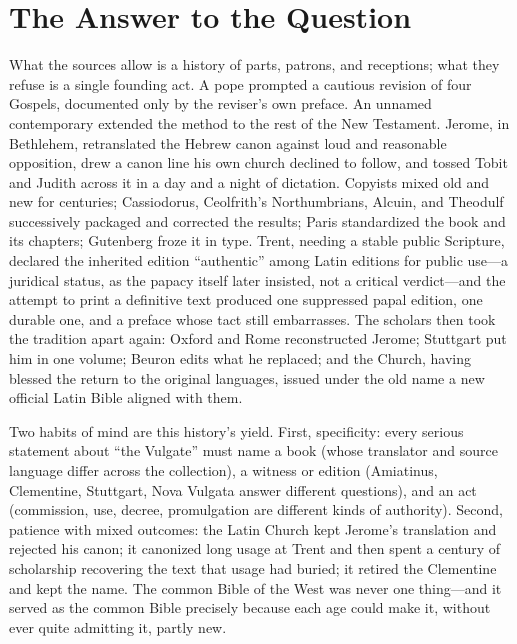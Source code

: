 \section{The Answer to the Question}

What the sources allow is a history of parts, patrons, and receptions;
what they refuse is a single founding act. A pope prompted a cautious
revision of four Gospels, documented only by the reviser's own preface.
An unnamed contemporary extended the method to the rest of the New
Testament. Jerome, in Bethlehem, retranslated the Hebrew canon against
loud and reasonable opposition, drew a canon line his own church declined
to follow, and tossed Tobit and Judith across it in a day and a night of
dictation. Copyists mixed old and new for centuries; Cassiodorus,
Ceolfrith's Northumbrians, Alcuin, and Theodulf successively packaged and
corrected the results; Paris standardized the book and its chapters;
Gutenberg froze it in type. Trent, needing a stable public Scripture,
declared the inherited edition ``authentic'' among Latin editions for
public use---a juridical status, as the papacy itself later insisted, not
a critical verdict---and the attempt to print a definitive text produced
one suppressed papal edition, one durable one, and a preface whose tact
still embarrasses. The scholars then took the tradition apart again:
Oxford and Rome reconstructed Jerome; Stuttgart put him in one volume;
Beuron edits what he replaced; and the Church, having blessed the return
to the original languages, issued under the old name a new official Latin
Bible aligned with them.

Two habits of mind are this history's yield. First, specificity: every
serious statement about ``the Vulgate'' must name a book (whose
translator and source language differ across the collection), a witness
or edition (Amiatinus, Clementine, Stuttgart, Nova Vulgata answer
different questions), and an act (commission, use, decree, promulgation
are different kinds of authority). Second, patience with mixed outcomes:
the Latin Church kept Jerome's translation and rejected his canon; it
canonized long usage at Trent and then spent a century of scholarship
recovering the text that usage had buried; it retired the Clementine and
kept the name. The common Bible of the West was never one thing---and it
served as the common Bible precisely because each age could make it,
without ever quite admitting it, partly new.
